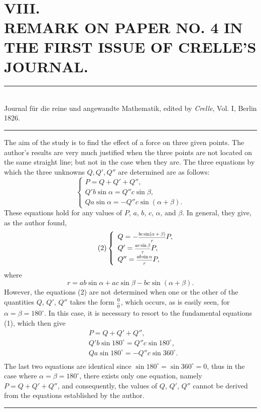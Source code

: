 \documentclass[oneside, 12 pt, leqno]{memoir}
\let\oldfrac\frac
\def\frac#1#2{\mathchoice{\text{\scalebox{.83}{${\oldfrac{#1}{#2}}$}}}{\text{\scalebox{.83}{${\displaystyle\oldfrac{#1}{#2}}$}}}{\genfrac{}{}{}{2}{#1}{#2}}{\genfrac{}{}{}{3}{#1}{#2}}}
\begin{document}
\setlength{\abovedisplayskip}{0.33\baselineskip plus .16\baselineskip minus .16\baselineskip}
\setlength{\belowdisplayskip}{0.33\baselineskip plus .16\baselineskip minus .16\baselineskip}

\;\\[4\baselineskip]
\section*{{\Large VIII.} \\ [\baselineskip]
REMARK ON PAPER NO. 4 IN THE FIRST ISSUE OF CRELLE'S JOURNAL.}
\begin{center}
\rule{2in}{0.1pt}\\
{\tiny Journal für die reine und angewandte Mathematik, edited by \textit{Crelle}, Vol. I, Berlin 1826.}\\
\rule{2in}{0.1pt}
\end{center}

The aim of the study is to find the effect of a force on three given points. The author's results are very much justified when the three points are not located on the same straight line; but not in the case when they are. The three equations by which the three unknowns \(Q, Q', Q''\) are determined are as follows:
\[\tag{1}\left\{\begin{array}{l}
P=Q+Q'+Q'', \\
Q'b\sin\alpha=Q''c\sin\beta, \\
Qa\sin\alpha=-Q''c\sin(\alpha+\beta).
\end{array}\right.\]
These equations hold for any values of \(P\), \(a\), \(b\), \(c\), \(\alpha\), and \(\beta\). In general, they give, as the author found,
\[\tag{2}\left\{\begin{array}{l}
Q=-\frac{bc\sin(\alpha+\beta)}{r}P, \\[0.25\normalbaselineskip] 
Q'=\frac{ac\sin\beta}{r}P, \\[0.25\normalbaselineskip] 
Q''=\frac{ab\sin\alpha}{r}P,
\end{array}\right.\]
where
\[r=ab\sin\alpha+ac\sin\beta-bc\sin(\alpha+\beta).\]
However, the equations (2) are not determined when one or the other of the quantities \(Q\), \(Q'\), \( Q''\) takes the form \(\frac{0}{0}\), which occurs, as is easily seen, for \(\alpha=\beta=180^{\circ}\). In this case, it is necessary to resort to the fundamental equations (1), which then give
\[\begin{aligned}
&P=Q+Q'+Q'', \\
&Q'b\sin 180^{\circ}=Q''c\sin 180^{\circ},\\
&Qa\sin 180^{\circ}=-Q''c\sin 360^{\circ}.\\
\end{aligned}\]
The last two equations are identical since \(\sin 180^{\circ}=\sin 360^{\circ}=0\), thus in the case where \(\alpha=\beta=180^{\circ}\), there exists only one equation, namely \(P=Q+Q'+Q''\), and consequently, the values of \(Q\), \(Q'\), \(Q''\) cannot be derived from the equations established by the author.
\begin{center}\rule{2in}{0.1pt}\end{center}
\vfill
\end{document}
